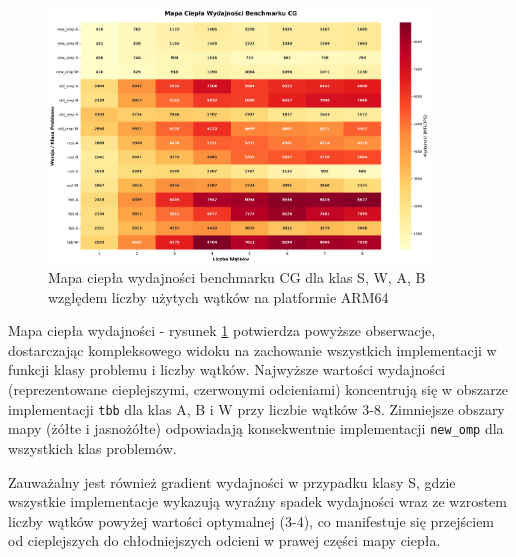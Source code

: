 \begin{figure}[H]
    \centering
    \includegraphics[width=0.9\textwidth]{analiza/images/parallel/cg/arm/cg_mapa_ciepla_wydajnosci.png}
    \caption{Mapa ciepła wydajności benchmarku CG dla klas S, W, A, B względem liczby użytych wątków na platformie ARM64}
    \label{cg_heatmap_wydajnosci}
\end{figure}
Mapa ciepła wydajności - rysunek \ref{cg_heatmap_wydajnosci} potwierdza powyższe obserwacje, dostarczając kompleksowego widoku na zachowanie wszystkich implementacji w funkcji klasy problemu i liczby wątków. Najwyższe wartości wydajności (reprezentowane cieplejszymi, czerwonymi odcieniami) koncentrują się w obszarze implementacji \texttt{tbb} dla klas A, B i W przy liczbie wątków 3-8. Zimniejsze obszary mapy (żółte i jasnożółte) odpowiadają konsekwentnie implementacji \texttt{new\_omp} dla wszystkich klas problemów.

Zauważalny jest również gradient wydajności w przypadku klasy S, gdzie wszystkie implementacje wykazują wyraźny spadek wydajności wraz ze wzrostem liczby wątków powyżej wartości optymalnej (3-4), co manifestuje się przejściem od cieplejszych do chłodniejszych odcieni w prawej części mapy ciepła.


